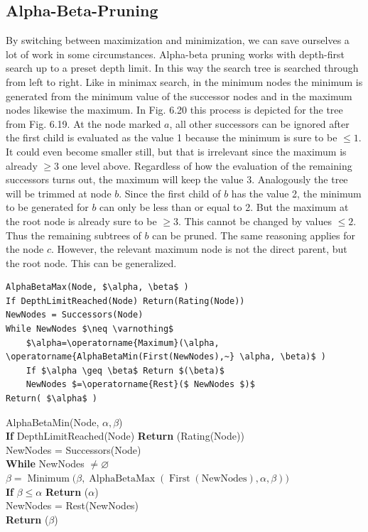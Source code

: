 \documentclass[10pt]{book}
\begin{document}
\subsection{Alpha-Beta-Pruning}
By switching between maximization and minimization, we can save ourselves a lot of work in some circumstances. Alpha-beta pruning works with depth-first search up to a preset depth limit. In this way the search tree is searched through from left to right. Like in minimax search, in the minimum nodes the minimum is generated from the minimum value of the successor nodes and in the maximum nodes likewise the maximum. In Fig. 6.20 this process is depicted for the tree from Fig. 6.19. At the node marked $a$, all other successors can be ignored after the first child is evaluated as the value 1 because the minimum is sure to be $\leq 1$. It could even become smaller still, but that is irrelevant since the maximum is already $\geq 3$ one level above. Regardless of how the evaluation of the remaining successors turns out, the maximum will keep the value 3. Analogously the tree will be trimmed at node $b$. Since the first child of $b$ has the value 2, the minimum to be generated for $b$ can only be less than or equal to 2. But the maximum at the root node is already sure to be $\geq 3$. This cannot be changed by values $\leq 2$. Thus the remaining subtrees of $b$ can be pruned.
The same reasoning applies for the node $c$. However, the relevant maximum node is not the direct parent, but the root node. This can be generalized.

\begin{verbatim}
AlphaBetaMax(Node, $\alpha, \beta$ )
If DepthLimitReached(Node) Return(Rating(Node))
NewNodes = Successors(Node)
While NewNodes $\neq \varnothing$
    $\alpha=\operatorname{Maximum}(\alpha, \operatorname{AlphaBetaMin(First(NewNodes),~} \alpha, \beta)$ )
    If $\alpha \geq \beta$ Return $(\beta)$
    NewNodes $=\operatorname{Rest}($ NewNodes $)$
Return( $\alpha$ )
\end{verbatim}

AlphaBetaMin(Node, $\alpha, \beta$)\\
\textbf{If} DepthLimitReached(Node) \textbf{Return} (Rating(Node))\\
NewNodes = Successors(Node)\\
\textbf{While} NewNodes $\neq \varnothing$\\
$\beta = \operatorname{Minimum}\!\bigl(\beta, \operatorname{AlphaBetaMax}(\operatorname{First}(\text{NewNodes}), \alpha, \beta)\bigr)$\\
\textbf{If} $\beta \leq \alpha$ \textbf{Return} ($\alpha$)\\
NewNodes = Rest(NewNodes)\\
\textbf{Return} ($\beta$)
\end{document}
